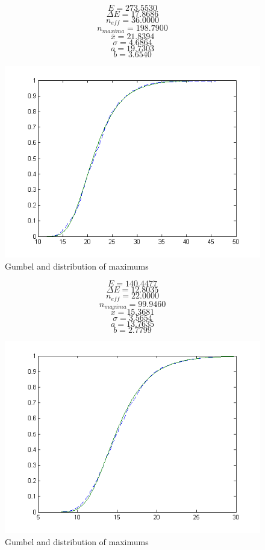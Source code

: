 \documentclass[12pt]{article}
\begin{document}
\pagebreak

\[E = 273.5530\]
\[\Delta E = 17.8686\]
\[n_{eff} = 36.0000\]
\[n_{maxima} = 198.7900\]
\[\bar{x} = 21.8394\]
\[\sigma = 4.6864\]
\[a = 19.7303\]
\[b = 3.6540\]

\begin{figure}[hbpt]
	\centering
		\includegraphics[width=1.00\textwidth]{eg8.png}
	\caption{Gumbel and distribution of maximums}
	\label{fig:eg8}
\end{figure}

\pagebreak

\[E = 140.4477\]
\[\Delta E = 12.8035\]
\[n_{eff} = 22.0000\]
\[n_{maxima} = 99.9460\]
\[\bar{x} = 15.3681\]
\[\sigma = 3.5654\]
\[a = 13.7635\]
\[b = 2.7799\]

\begin{figure}[hbpt]
	\centering
		\includegraphics[width=1.00\textwidth]{eg7.png}
	\caption{Gumbel and distribution of maximums}
	\label{fig:eg7}
\end{figure}
\end{document}
